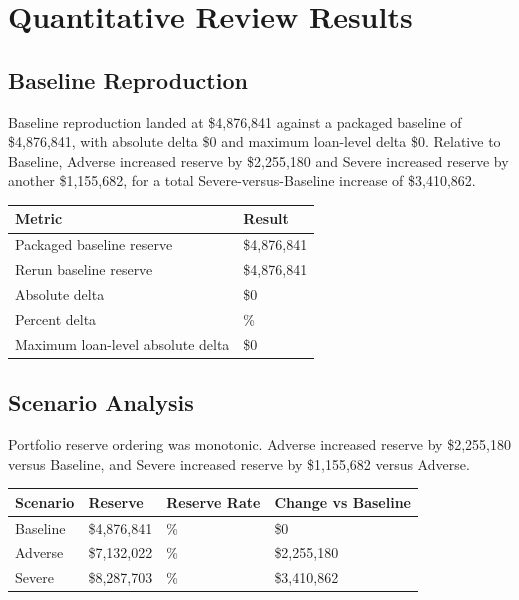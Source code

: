 \documentclass[11pt]{article}
\begin{document}
\section*{Quantitative Review Results}
\subsection*{Baseline Reproduction}
Baseline reproduction landed at \$4,876,841 against a packaged baseline of \$4,876,841, with absolute delta \$0 and maximum loan-level delta \$0. Relative to Baseline, Adverse increased reserve by \$2,255,180 and Severe increased reserve by another \$1,155,682, for a total Severe-versus-Baseline increase of \$3,410,862.
\begin{center}
\begin{tabularx}{\textwidth}{>{\raggedright\arraybackslash}p{}>{\raggedright\arraybackslash}p{}}
\toprule
Metric & Result \\
\midrule
Packaged baseline reserve & \$4,876,841 \\
Rerun baseline reserve & \$4,876,841 \\
Absolute delta & \$0 \\
Percent delta & 0.000\% \\
Maximum loan-level absolute delta & \$0 \\
\bottomrule
\end{tabularx}
\end{center}
\subsection*{Scenario Analysis}
Portfolio reserve ordering was monotonic. Adverse increased reserve by \$2,255,180 versus Baseline, and Severe increased reserve by \$1,155,682 versus Adverse.
\begin{center}
\small
\begin{tabularx}{\textwidth}{>{\raggedright\arraybackslash}p{}>{\raggedright\arraybackslash}p{}>{\raggedright\arraybackslash}p{}>{\raggedright\arraybackslash}p{}}
\toprule
Scenario & Reserve & Reserve Rate & Change vs Baseline \\
\midrule
Baseline & \$4,876,841 & 0.60\% & \$0 \\
Adverse & \$7,132,022 & 0.88\% & \$2,255,180 \\
Severe & \$8,287,703 & 1.03\% & \$3,410,862 \\
\bottomrule
\end{tabularx}
\normalsize
\end{center}
\end{document}
